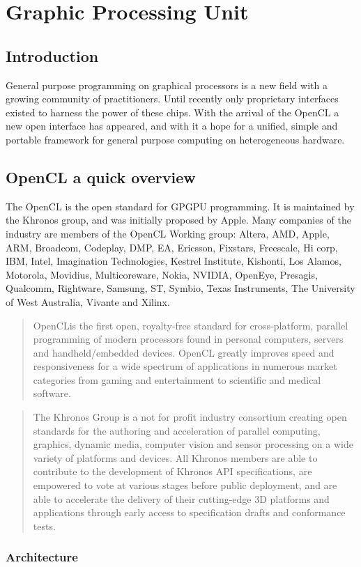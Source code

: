 %

\chapter{Graphic Processing Unit}

\section{Introduction}

General purpose programming on graphical processors is a new field with a growing community of practitioners. Until recently only proprietary interfaces existed to harness the power of these chips. With the arrival of the \gls{OpenCL} a new open interface has appeared, and with it a hope for a unified, simple and portable framework for general purpose computing on heterogeneous hardware.

\section{OpenCL a quick overview}

The \gls{OpenCL} is the open standard for \gls{GPGPU} programming. It is maintained by the Khronos group, and was initially proposed by Apple. Many companies of the industry are members of the \gls{OpenCL} Working group: Altera, AMD, Apple, ARM, Broadcom, Codeplay, DMP, EA, Ericsson, Fixstars, Freescale, Hi corp, IBM, Intel, Imagination Technologies, Kestrel Institute, Kishonti, Los Alamos, Motorola, Movidius, Multicoreware, Nokia, NVIDIA, OpenEye, Presagis, Qualcomm, Rightware, Samsung, ST, Symbio, Texas Instruments, The University of West Australia, Vivante and Xilinx.
\begin{quotation}
OpenCL\texttrademark is the first open, royalty-free standard for cross-platform, parallel programming of modern processors found in personal computers, servers and handheld/embedded devices. \gls{OpenCL} greatly improves speed and responsiveness for a wide spectrum of applications in numerous market categories from gaming and entertainment to scientific and medical software.
\end{quotation}
\begin{quotation}
The Khronos Group is a not for profit industry consortium creating open standards for the authoring and acceleration of parallel computing, graphics, dynamic media, computer vision and sensor processing on a wide variety of platforms and devices. All Khronos members are able to contribute to the development of Khronos \gls{API} specifications, are empowered to vote at various stages before public deployment, and are able to accelerate the delivery of their cutting-edge 3D platforms and applications through early access to specification drafts and conformance tests.
\end{quotation}

\subsection{Architecture}

